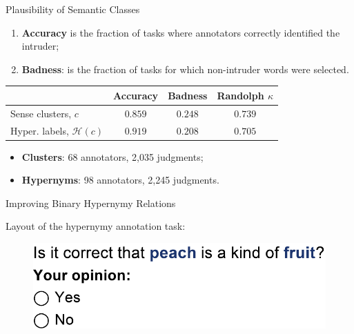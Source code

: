 \documentclass[usenames,dvipsnames,notes]{beamer}
\begin{document}
\begin{frame}{Plausibility of Semantic Classes}


\begin{enumerate}
	\item \textbf{Accuracy} is the fraction of tasks where annotators correctly identified the intruder; 
	\item \textbf{Badness}: is the fraction of tasks for which non-intruder words were selected.  
\end{enumerate}

\pause

\begin{tabular}{l|c|c|c}
\textbf{} & \textbf{Accuracy} & \textbf{Badness} & \textbf{Randolph $\kappa$} \\ \toprule
Sense clusters, $c$ & $0.859$ & $0.248$ & $0.739$ \\
Hyper. labels, $\mathcal{H}(c)$  & $0.919$ & $0.208$ & $0.705$ \\
\end{tabular}

\pause 

\begin{itemize}
	\item \textbf{Clusters}: 68 annotators, 2,035 judgments; 
	\item \textbf{Hypernyms}: 98 annotators, 2,245 judgments.
\end{itemize}

\end{frame}


\begin{frame}{ Improving Binary Hypernymy Relations }

Layout of the hypernymy annotation task:

\begin{figure}
  \centering
  \includegraphics[width=.88\textwidth]{figures/exp3-hit}
\end{figure}

\end{frame}
\end{document}
